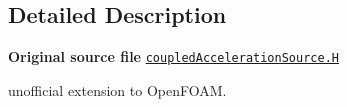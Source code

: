 \subsection{Detailed Description}
{\bfseries Original source file} \href{../../../home/carlo/data/GeN-Foam/GeN-Foam_ffn/GeN-Foam/GeN-Foam/FMU4FOAM/ECI4FOAM/src/externalComm/externalIO/input/fvOptions/coupledAccelerationSource/coupledAccelerationSource.H}{\tt coupled\+Acceleration\+Source.\+H}

\begin{DoxyVerb}unofficial extension to OpenFOAM.\end{DoxyVerb}
